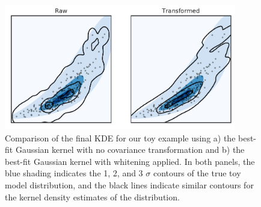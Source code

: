 \begin{figure}
    \centering
    \includegraphics[width=0.9\textwidth]{figures/snemo_kde/2d_scatter.pdf}
    \caption{Comparison of the final KDE for our toy example using a) the best-fit Gaussian kernel with no covariance transformation and b) the best-fit Gaussian kernel with whitening applied. In both panels, the blue shading indicates the 1, 2, and 3 $\sigma$ contours of the true toy model distribution, and the black lines indicate similar contours for the kernel density estimates of the distribution.}
    \label{fig:2d_scatter_scaled}
\end{figure}

